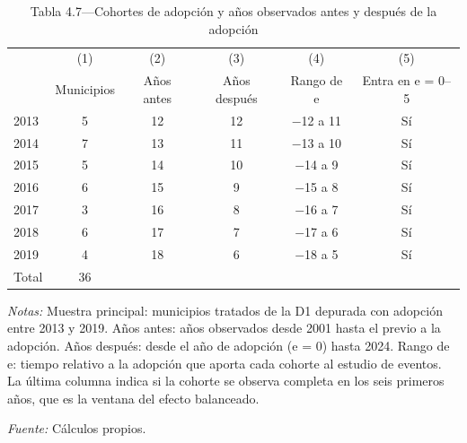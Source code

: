 \begin{table}[htbp]
\centering
\small
\caption{Tabla 4.7—Cohortes de adopción y años observados antes y después de la adopción}
\label{tab:tabla_4_7}
\begin{threeparttable}
\begin{tabular}{@{}lccccc@{}}
\toprule
 & (1) & (2) & (3) & (4) & (5) \\
 & Municipios & Años antes & Años después & Rango de e & Entra en e = 0--5 \\
\midrule
2013 & 5 & 12 & 12 & $-$12 a 11 & Sí \\
2014 & 7 & 13 & 11 & $-$13 a 10 & Sí \\
2015 & 5 & 14 & 10 & $-$14 a 9 & Sí \\
2016 & 6 & 15 & 9 & $-$15 a 8 & Sí \\
2017 & 3 & 16 & 8 & $-$16 a 7 & Sí \\
2018 & 6 & 17 & 7 & $-$17 a 6 & Sí \\
2019 & 4 & 18 & 6 & $-$18 a 5 & Sí \\
\midrule
Total & 36 &  &  &  &  \\
\bottomrule
\end{tabular}
\begin{tablenotes}[flushleft]
\footnotesize
\item \textit{Notas:} Muestra principal: municipios tratados de la D1 depurada con adopción entre 2013 y 2019. Años antes: años observados desde 2001 hasta el previo a la adopción. Años después: desde el año de adopción (e = 0) hasta 2024. Rango de e: tiempo relativo a la adopción que aporta cada cohorte al estudio de eventos. La última columna indica si la cohorte se observa completa en los seis primeros años, que es la ventana del efecto balanceado.
\item \textit{Fuente:} Cálculos propios.
\end{tablenotes}
\end{threeparttable}
\end{table}
